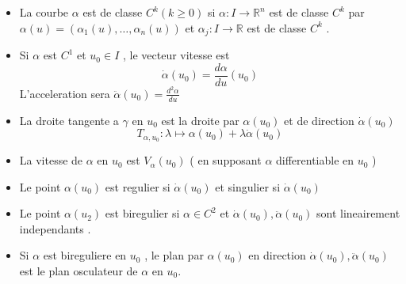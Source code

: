 \documentclass[../main.tex]{subfiles}
\begin{document}
\begin{defn}
	\begin{itemize}
		\item La courbe $\alpha$ est de classe $C^{k} ( k \geq 0) $ si $\alpha: I \to \mathbb{R}^n$ est de classe $C^{k}$ par $\alpha( u) = ( \alpha_1( u) , \ldots, \alpha_n( u) ) $ et $\alpha_j:I\to \mathbb{R}$ est de classe $C^{k}$ .
		\item Si $\alpha$ est $C^{1}$ et $u_0\in I$ , le vecteur vitesse est 
			\[ 
				\dot { \alpha} ( u_0) = \frac{d \alpha}{du}( u_0) 
			\]
			L'acceleration sera $\ddot { \alpha} ( u_0) = \frac{d^{2}\alpha}{d u}$ 	

		\item La droite tangente a $\gamma$ en $u_0$ est la droite par $\alpha( u_0) $ et de direction $\dot{ \alpha }( u_0) $ 
			\[ 
				T_{\alpha,u_0} : \lambda \mapsto \alpha( u_0) + \lambda \dot{\alpha} ( u_0) 
			\]
		
		\item La vitesse de $\alpha$ en $u_0$ est $V_\alpha( u_0) $ ( en supposant $\alpha$ differentiable en $u_0$ ) 
		\item Le point $\alpha( u_0) $ est regulier si $\dot{\alpha}( u_0) $ et singulier si $\dot{\alpha}( u_0) $ 
		\item Le point $\alpha( u_2) $  est biregulier si $\alpha\in C^{2}$ et $\dot{\alpha}( u_0), \ddot { \alpha} ( u_0) $	sont lineairement independants .
		\item Si $\alpha$ est bireguliere en $u_0$ , le plan par $\alpha( u_0) $ en direction $\dot { \alpha} ( u_0) , \ddot { \alpha} ( u_0) $ est le plan osculateur de $\alpha$ en $u_0$.
	\end{itemize}
	
\end{defn}
\end{document}
